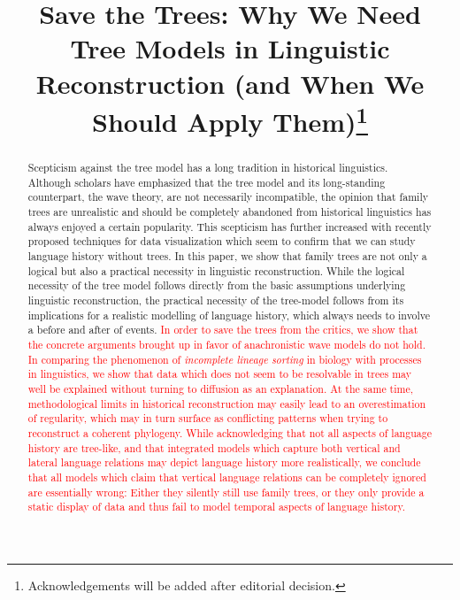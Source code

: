 \documentclass[svgnames,12pt]{scrartcl}
\title{Save the Trees: Why We Need Tree Models in Linguistic Reconstruction (and When We Should Apply Them)\footnote{Acknowledgements will be added after editorial decision.}}
\begin{document}
\maketitle

\begin{abstract}
  \small
Scepticism against the tree model has a long tradition in historical linguistics.  Although scholars
have emphasized that the tree model and its long-standing counterpart, the wave theory, are not
necessarily incompatible, the opinion that family trees are unrealistic and should be completely
abandoned from historical linguistics has always enjoyed a certain popularity. This scepticism has
further increased with recently proposed techniques for data visualization which seem to confirm
that we can study language history without trees.  In this paper, we show that family trees are not
only a logical but also a practical necessity in linguistic reconstruction. While the logical
necessity of the tree model follows directly from the basic assumptions underlying linguistic
reconstruction, the practical necessity of the tree-model follows from its implications for a
realistic modelling of language history, which always needs to involve a before and after of events.
\textcolor{red}{In order to save the trees from the critics, we show that the concrete arguments brought up in favor
of anachronistic wave models do not hold. In comparing the phenomenon of \emph{incomplete lineage
sorting} in biology with processes in linguistics, we show that data which does not seem to be
resolvable in trees may well be explained without turning to diffusion as an explanation. At the
same time, methodological limits in historical reconstruction may easily lead to an overestimation
of regularity, which may in turn surface as conflicting patterns when trying to reconstruct a
coherent phylogeny.  While acknowledging that not all aspects of language history are tree-like, and
that integrated models which capture both vertical and lateral language relations may depict
language history more realistically, we conclude that all models which claim that vertical language
relations can be completely ignored are essentially wrong: Either they silently still use family
trees, or they only provide a static display of data and thus fail to model temporal aspects of
language history.}
\end{abstract}
\end{document}
